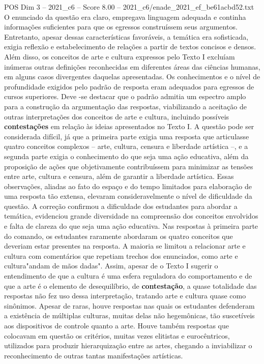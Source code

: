 \begin{textsample}{POS Dim 3 – 2021\_c6 – Score 8.00 – 2021\_c6/enade\_2021\_ef\_be61acbd52.txt}
O enunciado da questão era claro, empregava linguagem adequada e continha informações suficientes para que os egressos construíssem seus argumentos.
Entretanto, apesar dessas características favoráveis, a temática era sofisticada, exigia reflexão e estabelecimento de relações a partir de textos concisos e densos.
Além disso, os conceitos de arte e cultura expressos pelo Texto I excluíam inúmeras outras definições reconhecidas em diferentes áreas das ciências humanas, em alguns casos divergentes daquelas apresentadas.
Os conhecimentos e o nível de profundidade exigidos pelo padrão de resposta eram adequados para egressos de cursos superiores.
Deve -se destacar que o padrão admitia um espectro amplo para a construção da argumentação das respostas, viabilizando a aceitação de outras interpretações dos conceitos de arte e cultura, incluindo possíveis \textbf{contestações} em relação às ideias apresentados no Texto I.
A questão pode ser considerada difícil, já que a primeira parte exigia uma resposta que articulasse quatro conceitos complexos – arte, cultura, censura e liberdade artística –, e a segunda parte exigia o conhecimento do que seja uma ação educativa, além da proposição de ações que objetivamente contribuíssem para minimizar as tensões entre arte, cultura e censura, além de garantir a liberdade artística.
Essas observações, aliadas ao fato do espaço e do tempo limitados para elaboração de uma resposta tão extensa, elevaram consideravelmente o nível de dificuldade da questão.
A correção confirmou a dificuldade dos estudantes para abordar a temática, evidenciou grande diversidade na compreensão dos conceitos envolvidos e falta de clareza do que seja uma ação educativa.
Nas respostas à primeira parte do comando, os estudantes raramente abordaram os quatro conceitos que deveriam estar presentes na resposta.
A maioria se limitou a relacionar arte e cultura com comentários que repetiam trechos dos enunciados, como arte e cultura"andam de mãos dadas".
Assim, apesar de o Texto I sugerir o entendimento de que a cultura é uma esfera reguladora do comportamento e de que a arte é o elemento de desequilíbrio, de \textbf{contestação}, a quase totalidade das respostas não fez uso dessa interpretação, tratando arte e cultura quase como sinônimos.
Apesar de raras, houve respostas nas quais os estudantes defenderam a existência de múltiplas culturas, muitas delas não hegemônicas, tão suscetíveis aos dispositivos de controle quanto a arte.
Houve também respostas que colocavam em questão os critérios, muitas vezes elitistas e eurocêntricos, utilizados para produzir hierarquização entre as artes, chegando a inviabilizar o reconhecimento de outras tantas manifestações artísticas.

\end{textsample}
